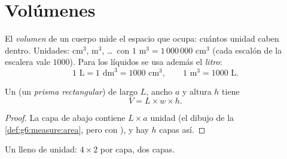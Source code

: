 \section{Volúmenes}

\begin{definition}[Volumen]\label{def:g6:measure:volume}
El \emph{volumen} de un cuerpo mide el espacio que ocupa:
cuántos  unidad caben dentro. Unidades: cm$^3$, m$^3$, \dots\ con
$1$ m$^3 = 1\,000\,000$ cm$^3$ (cada escalón de la escalera vale
$1000$). Para los líquidos se usa además el \emph{litro}:
\[
1 \text{ L} = 1 \text{ dm}^3 = 1000 \text{ cm}^3,
\qquad
1 \text{ m}^3 = 1000 \text{ L}.
\]
\end{definition}

\begin{proposition}\label{prop:g6:measure:box}
Un  (un \emph{prisma rectangular}) de largo $L$, ancho $a$
y altura $h$ tiene 
\[
V = L \times w \times h .
\]
\end{proposition}

\begin{proof}
La capa de abajo contiene $L \times a$  unidad
(el dibujo de la \cref{def:g6:measure:area}, pero con ), y hay $h$
capas así.
\end{proof}

\begin{omfigure}

{\small Un  lleno de  unidad: $4 \times 2$  por capa, dos
capas.}
\end{omfigure}

